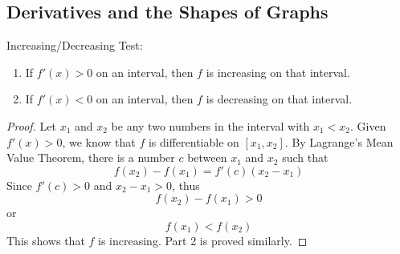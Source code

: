 \subsection{Derivatives and the Shapes of Graphs}

Increasing/Decreasing Test:
\begin{enumerate}
    \item If \(f'(x)>0\) on an interval, then \(f\) is increasing on that
    interval.
    \item If \(f'(x)<0\) on an interval, then \(f\) is decreasing on that
    interval.
\end{enumerate}
\begin{proof}
    Let \(x_1\) and \(x_2\) be any two numbers in the interval with
    \(x_1<x_2\).
    Given \(f'(x)>0\), we know that \(f\) is differentiable on \([x_1,x_2]\).
    By Lagrange's Mean Value Theorem, there is a number \(c\) between \(x_1\)
    and \(x_2\) such that
    \[f(x_2)-f(x_1)=f'(c)(x_2-x_1)\]
    Since \(f'(c)>0\) and \(x_2-x_1>0\), thus
    \[f(x_2)-f(x_1)>0\]
    or
    \[f(x_1)<f(x_2)\]
    This shows that \(f\) is increasing.
    Part 2 is proved similarly.
\end{proof}